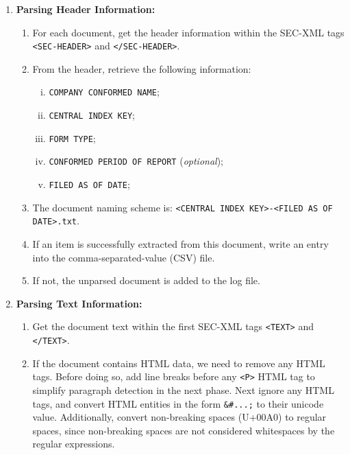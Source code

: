 \begin{enumerate}[A - ]
    \item   {\bf Parsing Header Information:}
        
        \begin{enumerate}[1.]
            
            \item   For each document, get the header information within the SEC-XML tags
                    \texttt{<SEC-HEADER>} and \texttt{</SEC-HEADER>}.
        
            \item   From the header, retrieve the following information:
                \begin{enumerate}[i)]
                    \item   \texttt{COMPANY CONFORMED NAME};
                    \item   \texttt{CENTRAL INDEX KEY};
                    \item   \texttt{FORM TYPE};
                    \item   \texttt{CONFORMED PERIOD OF REPORT} (\emph{optional});
                    \item   \texttt{FILED AS OF DATE};
                \end{enumerate}
            
            \item   The document naming scheme is: \texttt{<CENTRAL INDEX KEY>-<FILED AS OF DATE>.txt}.
            
            \item   If an item is successfully extracted from this document, write an
                    entry into the comma-separated-value (CSV) file.

            \item   If not, the unparsed document is added to the log file.
        
        \end{enumerate}

    \item   {\bf Parsing Text Information:}

        \begin{enumerate}[1.]

            \item   Get the document text within the first SEC-XML tags
                    \texttt{<TEXT>} and \texttt{</TEXT>}.

            \item   If the document contains HTML data, we need to remove any HTML tags.
                    Before doing so, add line breaks before any \texttt{<P>} HTML tag to simplify
                    paragraph detection in the next phase. Next ignore any HTML tags, and
                    convert HTML entities in the form \texttt{\&\#...;} to their unicode value.
                    Additionally, convert non-breaking spaces (U+00A0) to regular spaces,
                    since non-breaking spaces are not considered whitespaces by the regular
                    expressions.


\end{enumerate}
\end{enumerate}
